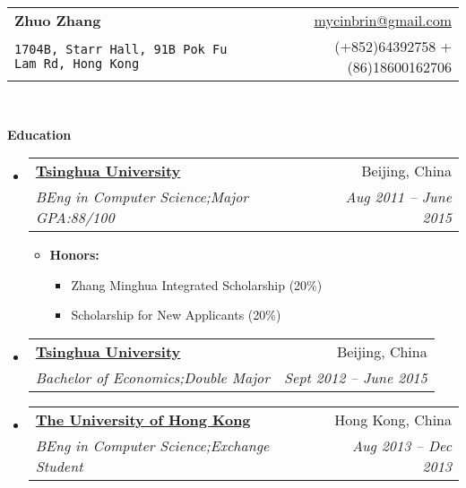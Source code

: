 \documentclass[letterpaper,11pt]{article}
\makeatletter
\newcommand{\resitem}[1]{\item #1 \vspace{-2pt}}
\newcommand{\resheading}[1]{{\large \colorbox{mygrey}{\begin{minipage}{\textwidth}{\textbf{#1 \vphantom{p\^{E}}}}\end{minipage}}}}
\newcommand{\ressubheading}[4]{
\begin{tabular*}{6.5in}{l@{\extracolsep{\fill}}r}
		\textbf{#1} & #2 \\
		\textit{#3} & \textit{#4} \\
\end{tabular*}\vspace{-6pt}}
\makeatother
\begin{document}
\newcommand{\mywebheader}{
\begin{tabular*}{7in}{l@{\extracolsep{\fill}}r}
	\textbf{{\LARGE Zhuo Zhang}} & \href{mailto:mycinbrin@gmail.com}{mycinbrin@gmail.com}\\
	{\footnotesize \texttt{1704B, Starr Hall, 91B Pok Fu Lam Rd, Hong Kong}} & {(+852)64392758 +(86)18600162706}
	\end{tabular*}
\\
\vspace{0.1in}}

\mywebheader

\resheading{Education}
	\begin{itemize}
			\item
				\ressubheading{\href{http://www.tsinghua.edu.cn}{Tsinghua University}}{Beijing, China}{{BEng in Computer Science};{Major GPA:88/100}}{Aug 2011 -- June 2015}
				{ \footnotesize
				\begin{itemize}
					\resitem{\textbf{Honors:}} 
						\begin{itemize}
								\resitem{Zhang Minghua Integrated Scholarship (20\%) }
								\resitem{Scholarship for New Applicants (20\%) }
						\end{itemize}
				\end{itemize}
				}
			\item
				\ressubheading{\href{http://www.tsinghua.edu.cn}{Tsinghua University}}{Beijing, China}{{Bachelor of Economics};{Double Major}}{Sept 2012 -- June 2015}{}
			\item
				\ressubheading{\href{http://www.hku.hku}{The University of Hong Kong}}{Hong Kong, China}{{BEng in Computer Science};{Exchange Student}}{Aug 2013 -- Dec 2013}{}
	\end{itemize} %
\end{document}
